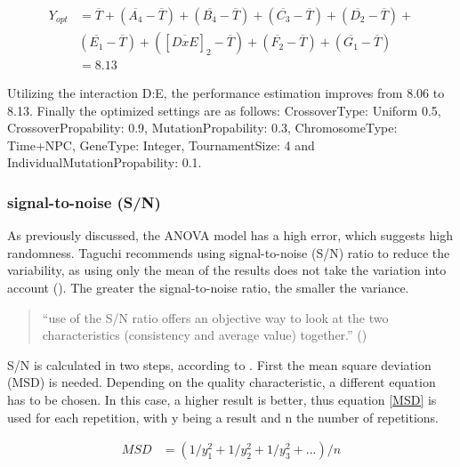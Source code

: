 \begin{equation} \label{optimum_perf_included_interaction}
	\begin{split}
		Y_{opt} &= \overline{T} + (\overline{A_4} - \overline{T}) + (\overline{B_4} - \overline{T}) + (\overline{C_3} - \overline{T}) + (\overline{D_2} - \overline{T}) + \\& (\overline{E_1} - \overline{T})  + ([\overline{DxE}]_2 - \overline{T})  + (\overline{F_2} - \overline{T}) + (\overline{G_1} - \overline{T}) \\
		&= 8.13
	\end{split}
\end{equation}

Utilizing the interaction D:E, the performance estimation improves from 8.06 to 8.13. Finally the optimized settings are as follows:
CrossoverType: Uniform 0.5, CrossoverPropability: 0.9, MutationPropability: 0.3, ChromosomeType: Time+NPC, GeneType: Integer, TournamentSize: 4 and IndividualMutationPropability: 0.1.

\subsubsection{signal-to-noise (S/N)}
As previously discussed, the ANOVA model has a high error, which suggests high randomness. Taguchi recommends using signal-to-noise (S/N) ratio to reduce the variability, as using only the mean of the results does not take the variation into account (\cite{roy_primer_1990}). The greater the signal-to-noise ratio, the smaller the variance.

\begin{quote}
	\begin{em}
		\enquote{use of the S/N ratio offers an objective way to look at the two characteristics (consistency and average value) together.} (\cite{roy_primer_1990})
	\end{em}
\end{quote}

S/N is calculated in two steps, according to \cite{roy_primer_1990}. First the mean square deviation (MSD) is needed. Depending on the quality characteristic, a different equation has to be chosen. In this case, a higher result is better, thus equation \ref{MSD} is used for each repetition, with y being a result and n the number of repetitions.

\begin{equation} \label{MSD}
	\begin{split}
		MSD & = (1/y^2_1 + 1/y^2_2 + 1/y^2_3 + ... ) / n
	\end{split}
\end{equation}

